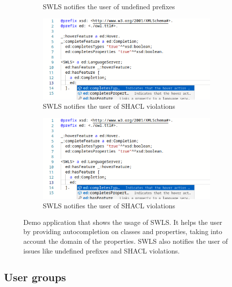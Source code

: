 \begin{figure}[h!tb]
\begin{subfigure}{0.48\textwidth}
      \caption{SWLS notifies the user of undefined prefixes}
      \label{undefined_prefix}
    \end{subfigure}
    \hfill
    \begin{subfigure}{0.48\textwidth}
      \includegraphics[width=\textwidth]{./images/property_complete.png}
      \caption{SWLS notifies the user of SHACL violations}
      \label{shacl_validation}
    \end{subfigure}
    \hfill
    \begin{subfigure}{0.48\textwidth}
      \includegraphics[width=\textwidth]{./images/property_complete.png}
      \caption{SWLS notifies the user of SHACL violations}
      \label{hover}
    \end{subfigure}
    \hfill
    \caption{
      Demo application that shows the usage of SWLS.
      It helps the user by providing autocompletion on classes and properties, taking into account the domain of the properties.
      SWLS also notifies the user of issues like undefined prefixes and SHACL violations.
    }\label{lst:Demo}
\end{figure}


\subsection{User groups}

